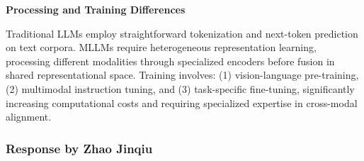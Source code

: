 \documentclass[12pt,a4paper]{article}
\begin{document}
\textbf{Processing and Training Differences}

Traditional LLMs employ straightforward tokenization and next-token prediction on text corpora. MLLMs require heterogeneous representation learning, processing different modalities through specialized encoders before fusion in shared representational space. Training involves: (1) vision-language pre-training, (2) multimodal instruction tuning, and (3) task-specific fine-tuning, significantly increasing computational costs and requiring specialized expertise in cross-modal alignment.

\subsubsection{Response by Zhao Jinqiu}
\end{document}
